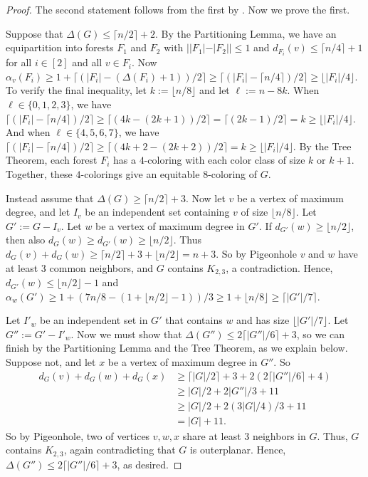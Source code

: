 \documentclass[11pt]{article}
\theoremstyle{definition}
\newcommand\floor[1]{\lfloor#1\rfloor}
\newcommand\ceil[1]{\lceil#1\rceil}
\renewcommand\ge\geqslant
\renewcommand\le\leqslant
\begin{document}
\begin{proof}
	The second statement follows from the first by .  Now we prove the first.

	Suppose that $\Delta(G)\le \ceil{n/2}+2$.  
	By the Partitioning Lemma, we have an equipartition into forests $F_1$ and $F_2$ with $||F_1|-|F_2||\le 1$
	and $d_{F_i}(v)\le \ceil{n/4}+1$ for all $i\in[2]$ and all $v\in F_i$.
	Now $\alpha_v(F_i)\ge 1 + \ceil{(|F_i|-(\Delta(F_i)+1))/2}\ge \ceil{(|F_i|-\ceil{n/4})/2}\ge \floor{|F_i|/4}$.
	To verify the final inequality, let $k:=\floor{n/8}$ and let $\ell:=n-8k$.  When $\ell\in\{0,1,2,3\}$, we have
	$\ceil{(|F_i|-\ceil{n/4})/2}\ge \ceil{(4k-(2k+1))/2}=\ceil{(2k-1)/2}=k\ge \floor{|F_i|/4}$.  And when $\ell\in\{4,5,6,7\}$,
	we have $\ceil{(|F_i|-\ceil{n/4})/2}\ge \ceil{(4k+2-(2k+2))/2}=k\ge \floor{|F_i|/4}$.  
	By the Tree Theorem, each forest $F_i$ has a $4$-coloring with each color class of size $k$ or $k+1$.  Together, these $4$-colorings
	give an equitable $8$-coloring of $G$.

	Instead assume that $\Delta(G)\ge \ceil{n/2}+3$.
	Now let $v$ be a vertex of maximum degree, and let $I_v$ be an independent set containing $v$ of size $\floor{n/8}$.
	Let $G':=G-I_v$.  Let $w$ be a vertex of maximum degree in $G'$.  If $d_{G'}(w)\ge \floor{n/2}$, then also $d_G(w)\ge d_{G'}(w)\ge \floor{n/2}$.
	Thus $d_G(v)+d_G(w)\ge \ceil{n/2}+3 + \floor{n/2} = n+3$. 
	So by Pigeonhole $v$ and $w$ have at least $3$ common neighbors, and $G$ contains $K_{2,3}$, a contradiction.
	Hence, $d_{G'}(w)\le \floor{n/2}-1$ and $\alpha_w(G')\ge 1 + (7n/8-(1+\floor{n/2}-1))/3\ge 1 + \floor{n/8}\ge \ceil{|G'|/7}$. 
	

	Let $I'_w$ be an independent set in $G'$ that contains $w$ and has size $\floor{|G'|/7}$.  Let $G'':=G'-I'_w$.  
	Now we must show that $\Delta(G'') \le 2\ceil{|G''|/6}+3$, so we can finish by the Partitioning Lemma and the Tree Theorem, as we explain below.
	Suppose not, and let $x$ be a vertex of maximum degree in $G''$.  So 
	\begin{align*}
		d_G(v)+d_G(w)+d_G(x) &\ge \ceil{|G|/2}+3+2(2\ceil{|G''|/6}+4)\\
				     &\ge |G|/2 + 2|G''|/3 + 11\\
				     &\ge |G|/2 + 2(3|G|/4)/3 + 11\\
				     &= |G|+11.
	\end{align*}
	So by Pigeonhole, two of vertices $v,w,x$ share at least $3$ neighbors in $G$.  
	Thus, $G$ contains $K_{2,3}$, again contradicting that $G$ is outerplanar.  Hence, $\Delta(G'')\le 2\ceil{|G''|/6}+3$, as desired.


\end{proof}
\end{document}
